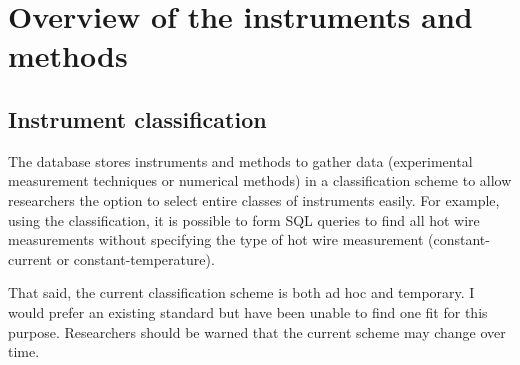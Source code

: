 %
\chapter{Overview of the instruments and methods}


\section{Instrument classification}

The database stores instruments and methods to gather data (experimental
measurement techniques or numerical methods) in a classification scheme to
allow researchers the option to select entire classes of instruments easily.
For example, using the classification, it is possible to form SQL queries to
find all hot wire measurements without specifying the type of hot wire
measurement (constant-current or constant-temperature).

That said, the current classification scheme is both ad hoc and temporary.  I
would prefer an existing standard but have been unable to find one fit for this
purpose.  Researchers should be warned that the current scheme may change over
time.



